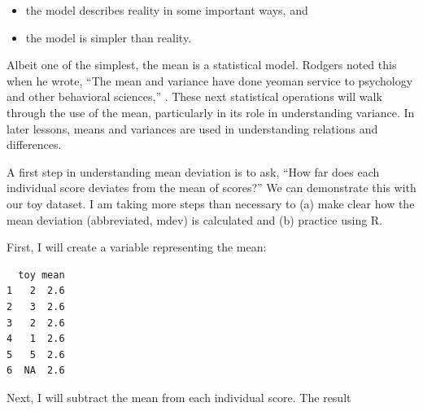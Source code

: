 \documentclass[
  11pt,
]{book}
\newenvironment{Shaded}{\begin{snugshade}}{\end{snugshade}}
\newcommand{\AttributeTok}[1]{\textcolor[rgb]{0.27,0.27,0.27}{#1}}
\newcommand{\CommentTok}[1]{\textcolor[rgb]{0.37,0.37,0.37}{\textit{#1}}}
\newcommand{\ConstantTok}[1]{\textcolor[rgb]{0.37,0.37,0.37}{#1}}
\newcommand{\FunctionTok}[1]{\textcolor[rgb]{0.27,0.27,0.27}{\textbf{#1}}}
\newcommand{\NormalTok}[1]{#1}
\newcommand{\OtherTok}[1]{\textcolor[rgb]{0.37,0.37,0.37}{#1}}
\newcommand{\SpecialCharTok}[1]{\textcolor[rgb]{0.43,0.43,0.43}{\textbf{#1}}}
\providecommand{\tightlist}{%
  \setlength{\itemsep}{0pt}\setlength{\parskip}{0pt}}
\begin{document}
\begin{itemize}
\tightlist
\item
  the model describes reality in some important ways, and
\item
  the model is simpler than reality.
\end{itemize}

Albeit one of the simplest, the mean is a statistical model. Rodgers noted this when he wrote, ``The mean and variance have done yeoman service to psychology and other behavioral sciences,'' \citeyearpar[p.~4]{rodgers_epistemology_2010}. These next statistical operations will walk through the use of the mean, particularly in its role in understanding variance. In later lessons, means and variances are used in understanding relations and differences.

A first step in understanding mean deviation is to ask, ``How far does each individual score deviates from the mean of scores?'' We can demonstrate this with our toy dataset. I am taking more steps than necessary to (a) make clear how the mean deviation (abbreviated, mdev) is calculated and (b) practice using R.

First, I will create a variable representing the mean:

\begin{Shaded}
\end{Shaded}

\begin{verbatim}
  toy mean
1   2  2.6
2   3  2.6
3   2  2.6
4   1  2.6
5   5  2.6
6  NA  2.6
\end{verbatim}

Next, I will subtract the mean from each individual score. The result

\begin{Shaded}
\end{Shaded}
\end{document}
